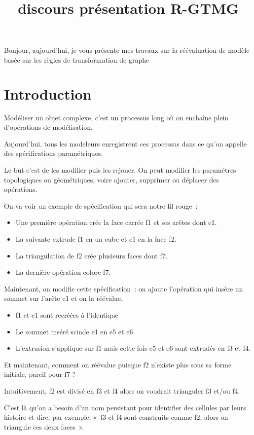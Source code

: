 \documentclass[11pt]{article}
\date{}
\title{discours présentation R-GTMG}
\begin{document}
\maketitle Bonjour, aujourd'hui, je vous présente mes travaux sur la
réévaluation de modèle basée sur les règles de transformation de graphe
\section{Introduction}
\label{sec:orgded3f04}

Modéliser un objet complexe, c'est un processus long où on enchaîne plein
d'opérations de modélisation.

Aujourd'hui, tous les modeleurs enregistrent ces processus dans ce qu'on appelle
des spécifications paramétriques.

Le but c'est de les modifier puis les rejouer. On peut modifier les paramètres
topologiques ou géométriques, voire ajouter, supprimer ou déplacer des
opérations.

On va voir un exemple de spécification qui sera notre fil rouge~:
\begin{itemize}
	\item Une première opération crée la face carrée f1 et ses arêtes dont e1.
	\item La suivante extrude f1 en un cube et e1 en la face f2.
	\item La triangulation de f2 crée plusieurs faces dont f7.
	\item La dernière opération colore f7.
\end{itemize}

Maintenant, on modifie cette spécification~: on ajoute l'opération qui insère un
sommet sur l'arête e1 et on la réévalue.

\begin{itemize}
	\item f1 et e1 sont recréées à l'identique
	\item Le sommet inséré scinde e1 en e5 et e6
	\item L'extrusion s'applique sur f1 mais cette fois e5 et e6 sont extrudés
en f3 et f4.
\end{itemize}

Et maintenant, comment on réévalue puisque f2 n'existe plus sous sa forme
initiale, pareil pour f7 ?

Intuitivement, f2 est divisé en f3 et f4 alors on voudrait trianguler f3 et/ou
f4.

C'est là qu'on a besoin d'un nom persistant pour identifier des cellules par
leurs histoire et dire, par exemple, «~f3 et f4 sont construits comme f2, alors
on triangule ces deux faces~».
\end{document}
